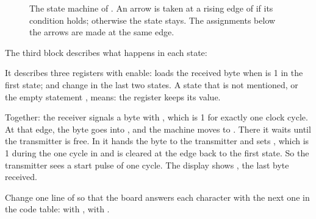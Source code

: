 \begin{figure}[ht]
\centering
{}
\caption{The state machine of . An arrow is taken at a
rising edge of  if its condition holds; otherwise the state stays. The
assignments below the arrows are made at the same edge.}
\label{fig:step06-fsm}
\end{figure}

The third block describes what happens in each state:


It describes three registers with enable:  loads the received
byte when  is 1 in the first state;  and
 change in the last two states. A state that is not mentioned,
or the empty statement \cc{;}, means: the register keeps its value.

Together: the receiver signals a byte with , which is 1 for
exactly one clock cycle. At that edge, the byte goes into , and
the machine moves to . There it waits until the
transmitter is free. In  it hands the byte to the
transmitter and sets , which is 1 during the one cycle in
 and is cleared at the edge back to the first
state. So the transmitter sees a start pulse of one cycle. The display shows
, the last byte received.

\begin{exercise}
\label{ex:step06-next}
Change one line of  so that the board answers each character with
the next one in the code table:  with ,  with .
\end{exercise}

